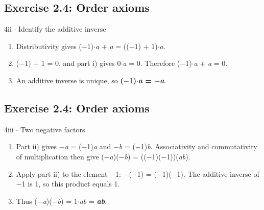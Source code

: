 \documentclass[11pt]{article}
\begin{document}
\begin{keepsection}\subsection{Exercise 2.4: Order axioms}

\begin{workedbox}{4ii \ensuremath{\cdot} Identify the additive inverse}
\begin{enumerate}
\item Distributivity gives (\ensuremath{-}1)\ensuremath{\cdot}\textit{a} + \textit{a} = ((\ensuremath{-}1) + 1)\ensuremath{\cdot}\textit{a}.
\item (\ensuremath{-}1) + 1 = 0, and part i) gives 0\ensuremath{\cdot}\textit{a} = 0. Therefore (\ensuremath{-}1)\ensuremath{\cdot}\textit{a} + \textit{a} = 0.
\item An additive inverse is unique, so \textbf{(\ensuremath{-}1)\ensuremath{\cdot}\textit{a} = \ensuremath{-}\textit{a}}.
\end{enumerate}
\end{workedbox}

\end{keepsection}
\begin{keepsection}\subsection{Exercise 2.4: Order axioms}

\begin{workedbox}{4iii \ensuremath{\cdot} Two negative factors}
\begin{enumerate}
\item Part ii) gives \ensuremath{-}\textit{a} = (\ensuremath{-}1)\textit{a} and \ensuremath{-}\textit{b} = (\ensuremath{-}1)\textit{b}. Associativity and commutativity of multiplication then give (\ensuremath{-}\textit{a})(\ensuremath{-}\textit{b}) = ((\ensuremath{-}1)(\ensuremath{-}1))(\textit{a}\textit{b}).
\item Apply part ii) to the element \ensuremath{-}1: \ensuremath{-}(\ensuremath{-}1) = (\ensuremath{-}1)(\ensuremath{-}1). The additive inverse of \ensuremath{-}1 is 1, so this product equals 1.
\item Thus (\ensuremath{-}\textit{a})(\ensuremath{-}\textit{b}) = 1\ensuremath{\cdot}\textit{a}\textit{b} = \textbf{\textit{a}\textit{b}}.
\end{enumerate}
\end{workedbox}

\end{keepsection}
\end{document}
